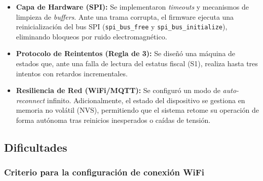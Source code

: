 \documentclass[12pt, a4paper]{article}
\begin{document}
    \begin{itemize}
        \item \textbf{Capa de Hardware (SPI):} Se implementaron \textit{timeouts} y mecanismos de limpieza de \textit{buffers}. Ante una trama corrupta, el firmware ejecuta una reinicialización del bus SPI (\texttt{spi\_bus\_free} y \texttt{spi\_bus\_initialize}), eliminando bloqueos por ruido electromagnético.
        
        \item \textbf{Protocolo de Reintentos (Regla de 3):} Se diseñó una máquina de estados que, ante una falla de lectura del estatus fiscal (S1), realiza hasta tres intentos con retardos incrementales. 
        
        \item \textbf{Resiliencia de Red (WiFi/MQTT):} Se configuró un modo de \textit{auto-reconnect} infinito. Adicionalmente, el estado del dispositivo se gestiona en memoria no volátil (NVS), permitiendo que el sistema retome su operación de forma autónoma tras reinicios inesperados o caídas de tensión.
    \end{itemize}

    \subsection*{Dificultades}

    {\color{red} \subsubsection*{Criterio para la configuración de conexión WiFi}}
\end{document}
